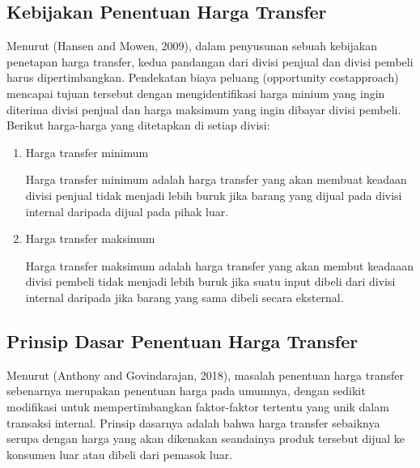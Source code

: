 	

\subsection{Kebijakan Penentuan Harga Transfer}

Menurut (Hansen and Mowen, 2009), dalam penyusunan sebuah kebijakan penetapan harga transfer, kedua pandangan dari divisi penjual dan divisi pembeli harus dipertimbangkan. Pendekatan biaya peluang (opportunity costapproach) mencapai tujuan tersebut dengan mengidentifikasi harga minium yang ingin diterima divisi penjual dan harga maksimum yang ingin dibayar divisi pembeli. Berikut harga-harga yang ditetapkan di setiap divisi:

\begin{enumerate}
	\item Harga transfer minimum
	
	Harga transfer minimum adalah harga transfer yang akan membuat keadaan divisi penjual tidak menjadi lebih buruk jika barang yang dijual pada divisi internal daripada dijual pada pihak luar.

	\item Harga transfer maksimum
	
	Harga transfer maksimum adalah harga transfer yang akan membut keadaaan divisi pembeli tidak menjadi lebih buruk jika suatu input dibeli dari divisi internal daripada jika barang yang sama dibeli secara eksternal. 
\end{enumerate}

\subsection{Prinsip Dasar Penentuan Harga Transfer}

Menurut (Anthony and Govindarajan, 2018), masalah penentuan harga transfer sebenarnya merupakan penentuan harga pada umumnya, dengan sedikit modifikasi untuk mempertimbangkan faktor-faktor tertentu yang unik dalam transaksi internal. Prinsip dasarnya adalah bahwa harga transfer sebaiknya serupa dengan harga yang akan dikenakan seandainya produk tersebut dijual ke konsumen luar atau dibeli dari pemasok luar.

